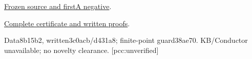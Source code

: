 \documentclass[10pt,a4paper]{article}
\begin{document}
\href{https://github.com/isogeny-labs/crypto/tree/257bf0f170d578d268454813a093de270c9906c5/research/chained_cm19_actual_j4_20261123}{Frozen source and firstA negative}.\par
\href{https://github.com/isogeny-labs/crypto/tree/62db83d43c31b028fa8fb68be94bf2caa2b53845/research/chained_cm19_actual_j4_20261123}{Complete certificate and written proofs}.\par
Data8b15b2, written3c0acb/d431a8; finite-point guard38ae70.
KB/Conductor unavailable; no novelty clearance. [pcc:unverified]
\end{document}
